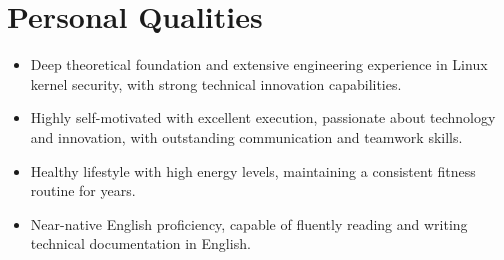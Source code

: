 \documentclass[11pt, a4paper]{article}
\begin{document}
\section{Personal Qualities}

\begin{itemize}
  \item Deep theoretical foundation and extensive engineering experience in Linux kernel security, with strong technical innovation capabilities.
  \item Highly self-motivated with excellent execution, passionate about technology and innovation, with outstanding communication and teamwork skills.
  \item Healthy lifestyle with high energy levels, maintaining a consistent fitness routine for years.
  \item Near-native English proficiency, capable of fluently reading and writing technical documentation in English.
\end{itemize}
\end{document}

